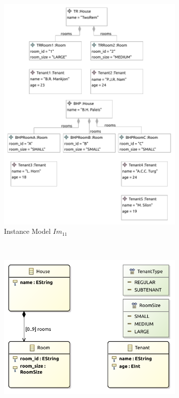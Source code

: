 \begin{figure}[p]
    \centering
    \begin{subfigure}{0.98\textwidth}
        \centering
        \includegraphics{images/06_application/instance_model/step11.pdf}
        \caption{Instance Model $Im_{11}$}
        \label{fig:application:building_the_model:the_tenant_type_enumeration_type:ecore:instance_model}
    \end{subfigure}
    \\
    \begin{subfigure}{0.98\textwidth}
        \centering
        \includegraphics{images/06_application/type_model/step11.pdf}

\end{subfigure}
\end{figure}
